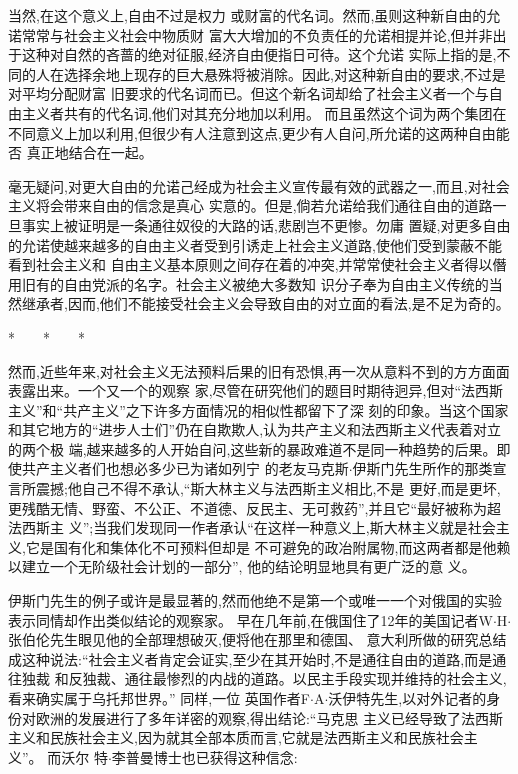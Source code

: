 ﻿\documentclass[12pt]{article}
\begin{document}
当然,在这个意义上,自由不过是权力 或财富的代名词。然而,虽则这种新自由的允诺常常与社会主义社会中物质财
富大大增加的不负责任的允诺相提并论,但并非出于这种对自然的吝蔷的绝对征服,经济自由便指日可待。这个允诺
实际上指的是,不同的人在选择余地上现存的巨大悬殊将被消除。因此,对这种新自由的要求,不过是对平均分配财富
旧要求的代名词而已。但这个新名词却给了社会主义者一个与自由主义者共有的代名词,他们对其充分地加以利用。
而且虽然这个词为两个集团在不同意义上加以利用,但很少有人注意到这点,更少有人自问,所允诺的这两种自由能否
真正地结合在一起。

毫无疑问,对更大自由的允诺己经成为社会主义宣传最有效的武器之一,而且,对社会主义将会带来自由的信念是真心
实意的。但是,倘若允诺给我们通往自由的道路一旦事实上被证明是一条通往奴役的大路的话,悲剧岂不更惨。勿庸
置疑,对更多自由的允诺使越来越多的自由主义者受到引诱走上社会主义道路,使他们受到蒙蔽不能看到社会主义和
自由主义基本原则之间存在着的冲突,并常常使社会主义者得以僭用旧有的自由党派的名字。社会主义被绝大多数知
识分子奉为自由主义传统的当然继承者,因而,他们不能接受社会主义会导致自由的对立面的看法,是不足为奇的。

*　　*　　*

然而,近些年来,对社会主义无法预料后果的旧有恐惧,再一次从意料不到的方方面面表露出来。一个又一个的观察
家,尽管在研究他们的题目时期待迥异,但对``法西斯主义''和``共产主义''之下许多方面情况的相似性都留下了深
刻的印象。当这个国家和其它地方的``进步人士们''仍在自欺欺人,认为共产主义和法西斯主义代表着对立的两个极
端,越来越多的人开始自问,这些新的暴政难道不是同一种趋势的后果。即使共产主义者们也想必多少已为诸如列宁
的老友马克斯$\cdot$伊斯门先生所作的那类宣言所震撼;他自己不得不承认,``斯大林主义与法西斯主义相比,不是
更好,而是更坏,更残酷无情、野蛮、不公正、不道德、反民主、无可救药'',并且它``最好被称为超法西斯主
义'';当我们发现同一作者承认``在这样一种意义上,斯大林主义就是社会主义,它是国有化和集体化不可预料但却是
不可避免的政冶附属物,而这两者都是他赖以建立一个无阶级社会计划的一部分'', 他的结论明显地具有更广泛的意
义。

伊斯门先生的例子或许是最显著的,然而他绝不是第一个或唯一一个对俄国的实验表示同情却作出类似结论的观察家。
早在几年前,在俄国住了12年的美国记者W$\cdot$H$\cdot$张伯伦先生眼见他的全部理想破灭,便将他在那里和德国、
意大利所做的研究总结成这种说法:``社会主义者肯定会证实,至少在其开始时,不是通往自由的道路,而是通往独裁
和反独裁、通往最惨烈的内战的道路。以民主手段实现并维持的社会主义,看来确实属于乌托邦世界。'' 同样,一位
英国作者F$\cdot$A$\cdot$沃伊特先生,以对外记者的身份对欧洲的发展进行了多年详密的观察,得出结论:``马克思
主义已经导致了法西斯主义和民族社会主义,因为就其全部本质而言,它就是法西斯主义和民族社会主义''。 而沃尔
特$\cdot$李普曼博士也已获得这种信念:
\end{document}
